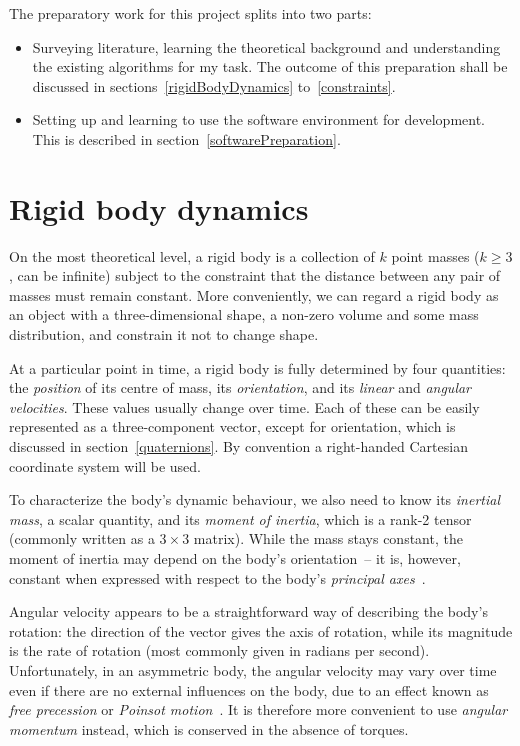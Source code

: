 The preparatory work for this project splits into two parts:
\begin{itemize}
\item Surveying literature, learning the theoretical background and understanding the existing
    algorithms for my task. The outcome of this preparation shall be discussed in
    sections~\ref{rigidBodyDynamics} to~\ref{constraints}.
\item Setting up and learning to use the software environment for development. This is described
    in section~\ref{softwarePreparation}.
\end{itemize}

\section{Rigid body dynamics\label{rigidBodyDynamics}}
On the most theoretical level, a rigid body is a collection of $k$ point masses ($k \ge 3$,
can be infinite) subject to the constraint that the distance between any pair of masses must
remain constant. More conveniently, we can regard a rigid body as an object with a
three-dimensional shape, a non-zero volume and some mass distribution, and constrain it not to
change shape.

At a particular point in time, a rigid body is fully determined by four quantities: the
\emph{position} of its centre of mass, its \emph{orientation}, and its \emph{linear} and
\emph{angular velocities}. These values usually change over time. Each of these can be easily
represented as a three-component vector, except for orientation, which is discussed in
section~\ref{quaternions}. By convention a right-handed Cartesian coordinate system will be used.

To characterize the body's dynamic behaviour, we also need to know its \emph{inertial mass},
a scalar quantity, and its \emph{moment of inertia}, which is a rank-2 tensor (commonly written
as a $3\times3$ matrix). While the mass stays constant, the moment of inertia may
depend on the body's orientation~-- it is, however, constant when expressed with respect to the
body's \emph{principal axes}~\cite{Feynman:63,Goldstein:80}.

Angular velocity appears to be a straightforward way of describing the body's rotation: the
direction of the vector gives the axis of rotation, while its magnitude is the rate of rotation
(most commonly given in radians per second). Unfortunately, in an asymmetric body, the angular
velocity may vary over time even if there are no external influences on the body, due to an effect
known as \emph{free precession} or \emph{Poinsot motion}~\cite{Goldstein:80}. It is therefore
more convenient to use \emph{angular momentum} instead, which is conserved in the absence of
torques.

